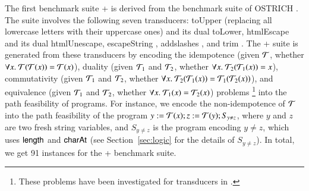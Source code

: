 The first benchmark suite {\transducerbench+} is derived from the {\transducerbench} benchmark suite of OSTRICH \cite{CHL+19}.  The {\transducerbench} suite involves the following seven transducers: toUpper (replacing all lowercase letters with their uppercase ones) and its dual toLower, htmlEscape \cite{htmlEscape} and its dual htmlUnescape, escapeString \cite{escapeString}, addslashes \cite{addslashes}, and trim \cite{trim}. The {\transducerbench+} suite is generated from these transducers by encoding the idempotence (given $\mathcal{T}$, whether $\forall x.\ \mathcal{T}(\mathcal{T}(x)) = \mathcal{T}(x)$), duality (given $\mathcal{T}_1$ and $\mathcal{T}_2$, whether $\forall x.\ \mathcal{T}_2(\mathcal{T}_1(x)) = x$), commutativity (given $\mathcal{T}_1$ and $\mathcal{T}_2$, whether $\forall x.\ \mathcal{T}_2(\mathcal{T}_1(x)) = \mathcal{T}_1(\mathcal{T}_2(x))$), and equivalence (given $\mathcal{T}_1$ and $\mathcal{T}_2$, whether $\forall x.\ \mathcal{T}_1(x) = \mathcal{T}_2(x)$) problems \footnote{These problems have been investigated for transducers in \cite{BEK}.} into the path feasibility of {\slint} programs. For instance, we encode the non-idempotence of $\mathcal{T}$ into the path feasibility of the {\slint} program $y:=\mathcal{T}(x); z:=\mathcal{T}(y); S_{y \neq z}$, where $y$ and $z$ are two fresh string variables, and $S_{y \neq z}$ is the {\slint} program encoding $y \neq z$, which uses $\mathsf{length}$ and $\mathsf{charAt}$ (see Section~\ref{sec:logic} for the details of $S_{y \neq z}$). In total, we get 91 instances for the {\transducerbench+} benchmark suite. 
%
%
%
%


